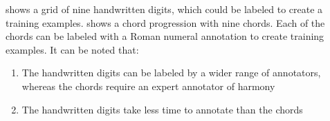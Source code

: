 


 shows a grid of nine handwritten digits,
which could be labeled to create a training examples.
 shows a chord progression with nine chords.
Each of the chords can be labeled with a Roman numeral
annotation to create training examples. It can be noted
that:

\begin{enumerate}
    \item The handwritten digits can be labeled by a wider range of annotators, whereas the chords require an expert annotator of harmony
    \item The handwritten digits take less time to annotate than the chords
\end{enumerate}

